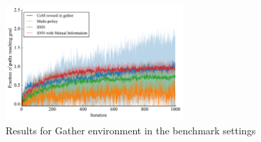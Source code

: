 \documentclass{article} %
\begin{document}
\begin{figure}[h!]
	\centering
	\label{fig:learn-gather-benchmark}
	\includegraphics[width = 0.6\textwidth]{Figures/learning-Gather.pdf}
	\caption{Results for Gather environment in the benchmark settings}
\end{figure}

\end{document}

